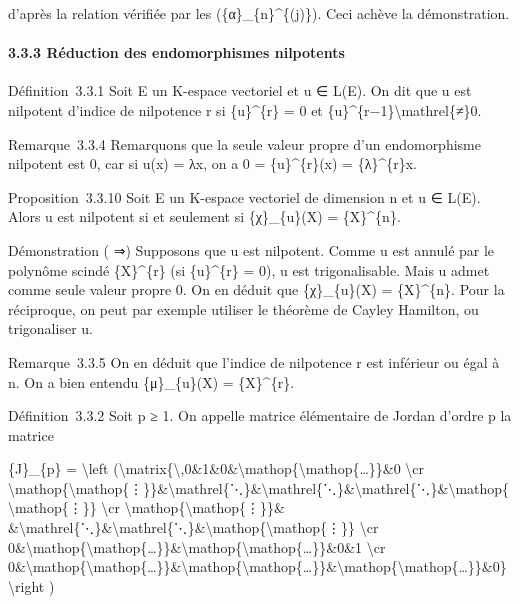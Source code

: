 \documentclass[]{article}
\begin{document}
d'après la relation vérifiée par les (\{α\}\_\{n\}\^{}\{(j)\}). Ceci
achève la démonstration.

\paragraph{3.3.3 Réduction des endomorphismes nilpotents}

Définition~3.3.1 Soit E un K-espace vectoriel et u ∈ L(E). On dit que u
est nilpotent d'indice de nilpotence r si \{u\}\^{}\{r\} = 0 et
\{u\}\^{}\{r−1\}\textbackslash{}mathrel\{≠\}0.

Remarque~3.3.4 Remarquons que la seule valeur propre d'un endomorphisme
nilpotent est 0, car si u(x) = λx, on a 0 = \{u\}\^{}\{r\}(x) =
\{λ\}\^{}\{r\}x.

Proposition~3.3.10 Soit E un K-espace vectoriel de dimension n et u ∈
L(E). Alors u est nilpotent si et seulement si \{χ\}\_\{u\}(X) =
\{X\}\^{}\{n\}.

Démonstration ( ⇒) Supposons que u est nilpotent. Comme u est annulé par
le polynôme scindé \{X\}\^{}\{r\} (si \{u\}\^{}\{r\} = 0), u est
trigonalisable. Mais u admet comme seule valeur propre 0. On en déduit
que \{χ\}\_\{u\}(X) = \{X\}\^{}\{n\}. Pour la réciproque, on peut par
exemple utiliser le théorème de Cayley Hamilton, ou trigonaliser u.

Remarque~3.3.5 On en déduit que l'indice de nilpotence r est inférieur
ou égal à n. On a bien entendu \{μ\}\_\{u\}(X) = \{X\}\^{}\{r\}.

Définition~3.3.2 Soit p ≥ 1. On appelle matrice élémentaire de Jordan
d'ordre p la matrice

\{J\}\_\{p\} = \textbackslash{}left
(\textbackslash{}matrix\{\textbackslash{},0\&1\&0\&\textbackslash{}mathop\{\textbackslash{}mathop\{\ldots{}\}\}\&0
\textbackslash{}cr
\textbackslash{}mathop\{\textbackslash{}mathop\{⋮\}\}\&\textbackslash{}mathrel\{⋱\}\&\textbackslash{}mathrel\{⋱\}\&\textbackslash{}mathrel\{⋱\}\&\textbackslash{}mathop\{\textbackslash{}mathop\{⋮\}\}
\textbackslash{}cr
\textbackslash{}mathop\{\textbackslash{}mathop\{⋮\}\}\&
\&\textbackslash{}mathrel\{⋱\}\&\textbackslash{}mathrel\{⋱\}\&\textbackslash{}mathop\{\textbackslash{}mathop\{⋮\}\}
\textbackslash{}cr
0\&\textbackslash{}mathop\{\textbackslash{}mathop\{\ldots{}\}\}\&\textbackslash{}mathop\{\textbackslash{}mathop\{\ldots{}\}\}\&0\&1
\textbackslash{}cr
0\&\textbackslash{}mathop\{\textbackslash{}mathop\{\ldots{}\}\}\&\textbackslash{}mathop\{\textbackslash{}mathop\{\ldots{}\}\}\&\textbackslash{}mathop\{\textbackslash{}mathop\{\ldots{}\}\}\&0\}\textbackslash{}right
)
\end{document}
